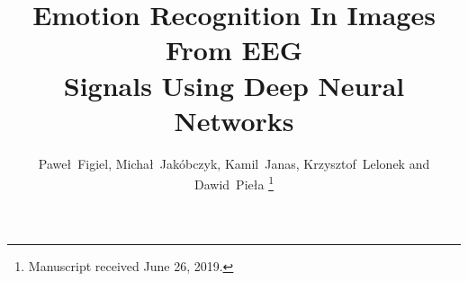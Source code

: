 \documentclass[10pt,journal,compsoc]{IEEEtran}
\begin{document}
%
\title{Emotion Recognition In Images From EEG\\
Signals Using Deep Neural Networks}
%
%
%
%

\author{Paweł~Figiel, Michał~Jakóbczyk, Kamil~Janas, Krzysztof~Lelonek and Dawid~Pieła%
\thanks{Manuscript received June 26, 2019.}}

% 
%
\end{document}
